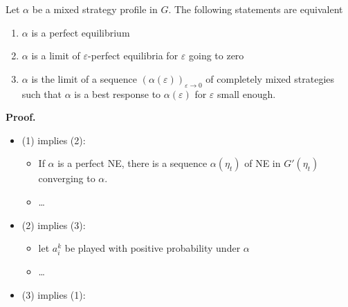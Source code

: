 \documentclass[compress]{beamer}    %
\newcommand{\ra}{\rightarrow}
\theoremstyle{plain}
\theoremstyle{definition}
\begin{document}
{\begin{theorem}\label{thm:def_perf_eq}
  Let $\alpha$ be a mixed strategy profile in $G$. The following statements are equivalent
  \begin{enumerate}
  \item $\alpha$ is a perfect equilibrium
  \item $\alpha$ is a limit of $\varepsilon $-perfect equilibria for $\varepsilon $ going to zero
  \item $\alpha$ is the limit of a sequence $(\alpha(\varepsilon ))_{\varepsilon \ra 0}$ of completely mixed strategies such that $\alpha$ is a best response to $\alpha(\varepsilon )$ for $\varepsilon $ small enough.
  \end{enumerate}
\end{theorem}
\textbf{Proof. }
\begin{itemize}
\item (1) implies (2):
  \begin{itemize}
  \item If $\alpha$ is a perfect NE, there is a sequence
    $\alpha(\eta_t)$ of NE in $G'(\eta_t)$ 
    converging to $\alpha$. 
  \item\dots%
  \end{itemize}
\item  (2) implies (3):
  \begin{itemize}
  \item let $a_i^k$ be played with positive probability under
    $\alpha$
  \item \dots %
  \end{itemize}
\item   (3) implies (1):
  \begin{itemize}

\end{itemize}
\end{itemize}}
\end{document}
